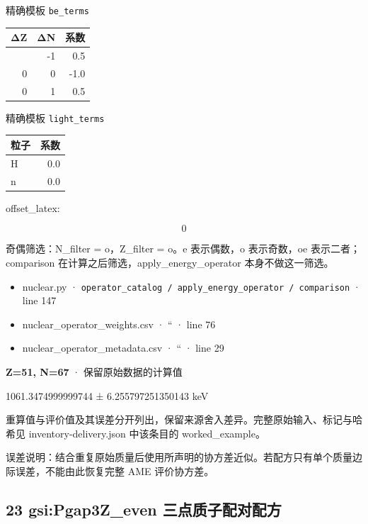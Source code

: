\documentclass[
  11pt,
  letterpaper,
]{article}
\providecommand{\tightlist}{%
  \setlength{\itemsep}{0pt}\setlength{\parskip}{0pt}}
\begin{document}
精确模板 \texttt{be\_terms}

\begin{longtable}[]{@{}rrr@{}}
\toprule\noalign{}
ΔZ & ΔN & 系数 \\
\midrule\noalign{}
\endhead
\bottomrule\noalign{}
\endlastfoot
0 & -1 & 0.5 \\
0 & 0 & -1.0 \\
0 & 1 & 0.5 \\
\end{longtable}

精确模板 \texttt{light\_terms}

\begin{longtable}[]{@{}lr@{}}
\toprule\noalign{}
粒子 & 系数 \\
\midrule\noalign{}
\endhead
\bottomrule\noalign{}
\endlastfoot
H & 0.0 \\
n & 0.0 \\
\end{longtable}

offset\_latex:

\[
0
\]

奇偶筛选：N\_filter = o，Z\_filter = o。e 表示偶数，o 表示奇数，oe
表示二者；comparison 在计算之后筛选，apply\_energy\_operator
本身不做这一筛选。

\begin{itemize}
\tightlist
\item
  nuclear.py ·
  \texttt{operator\_catalog\ /\ apply\_energy\_operator\ /\ comparison}
  · line 147
\item
  nuclear\_operator\_weights.csv · `` · line 76
\item
  nuclear\_operator\_metadata.csv · `` · line 29
\end{itemize}

\textbf{Z=51, N=67} · 保留原始数据的计算值

1061.3474999999744 ± 6.255797251350143 keV

重算值与评价值及其误差分开列出，保留来源舍入差异。完整原始输入、标记与哈希见
inventory-delivery.json 中该条目的 worked\_example。

误差说明：结合重复原始质量后使用所声明的协方差近似。若配方只有单个质量边际误差，不能由此恢复完整
AME 评价协方差。

\subsection{23 gsi:Pgap3Z\_even
三点质子配对配方}\label{gsipgap3z_even-ux4e09ux70b9ux8d28ux5b50ux914dux5bf9ux914dux65b9}
\end{document}
